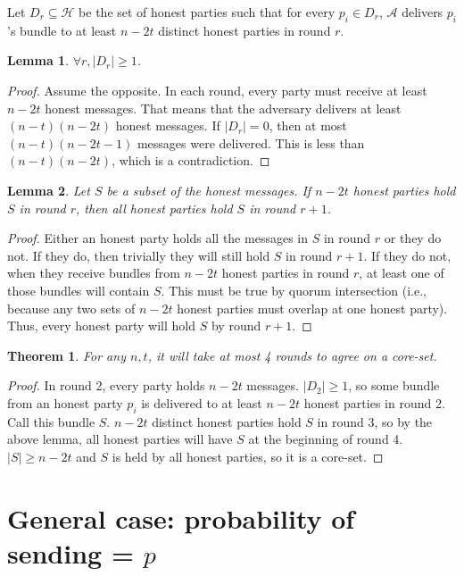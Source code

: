 \documentclass{article}
\newtheorem{lemma}{Lemma}
\newtheorem{theorem}{Theorem}
\begin{document}
Let $D_r \subseteq \mathcal H$ be the set of honest parties such that for every $p_i \in D_r$, $\mathcal A$ delivers $p_i$'s bundle to at least $n - 2t$ distinct honest parties in round $r$.
\begin{lemma}
$\forall r, |D_r| \geq 1$.
\end{lemma}
\begin{proof}
Assume the opposite. In each round, every party must receive at least $n - 2t$ honest messages. That means that the adversary delivers at least $(n-t)(n-2t)$ honest messages. If $|D_r| = 0$, then at most $(n-t)(n-2t-1)$ messages were delivered. This is less than $(n-t)(n-2t)$, which is a contradiction.
\end{proof}

\begin{lemma}
Let $S$ be a subset of the honest messages. If $n-2t$ honest parties hold $S$ in round $r$, then all honest parties hold $S$ in round $r+1$.
\end{lemma}
\begin{proof}
Either an honest party holds all the messages in $S$ in round $r$ or they do not. If they do, then trivially they will still hold $S$ in round $r+1$. If they do not, when they receive bundles from $n - 2t$ honest parties in round $r$, at least one of those bundles will contain $S$. This must be true by quorum intersection (i.e., because any two sets of $n-2t$ honest parties must overlap at one honest party). Thus, every honest party will hold $S$ by round $r+1$.
\end{proof}

\begin{theorem}
For any $n, t$, it will take at most 4 rounds to agree on a core-set.
\end{theorem}

\begin{proof}
In round 2, every party holds $n - 2t$ messages. $|D_2| \geq 1$, so some bundle from an honest party $p_i$ is delivered to at least $n - 2t$ honest parties in round 2. Call this bundle $S$. $n - 2t$ distinct honest parties hold $S$ in round 3, so by the above lemma, all honest parties will have $S$ at the beginning of round 4. $|S| \geq n - 2t$ and $S$ is held by all honest parties, so it is a core-set.
\end{proof}

\section{General case: probability of sending = $p$}
\end{document}
